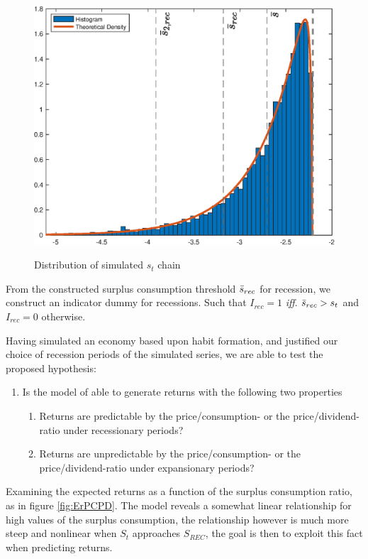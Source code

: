 \begin{figure}[H]
    \centering
    \caption{Distribution of simulated $s_t$ chain}
    \includegraphics[width=\textwidth]{Figures/DistributionS_t.eps}
    \label{fig:DistriSt}
\end{figure}
From the constructed surplus consumption threshold $\Bar{s}_{rec}$ for recession, we construct an indicator dummy for recessions. Such that $I_{rec} = 1$ \textit{iff}. $\Bar{s}_{rec} > s_t$ and $I_{rec}=0$ otherwise.

Having simulated an economy based upon habit formation, and justified our choice of recession periods of the simulated series, we are able to test the proposed hypothesis:
\begin{enumerate}
    \item Is the model of \citet{Campbell1999} able to generate returns with the following two properties
    \begin{enumerate}
        \item Returns are predictable by the price/consumption- or the price/dividend-ratio under recessionary periods?
        \item Returns are unpredictable by the price/consumption- or the price/dividend-ratio under expansionary periods?
    \end{enumerate}
\end{enumerate}
Examining the expected returns as a function of the surplus consumption ratio, as in figure \ref{fig:ErPCPD}. The model reveals a somewhat linear relationship for high values of the surplus consumption, the relationship however is much more steep and nonlinear when $S_t$ approaches ${S}_{REC}$, the goal is then to exploit this fact when predicting returns.

